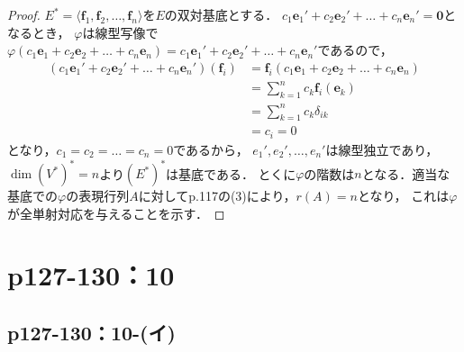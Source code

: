 \documentclass[a4paper,10pt,fleqn]{ltjsarticle}
\begin{document}
\begin{tleftbar}
\begin{proof}
        $ E^\ast = \langle \bm{f}_1 , \bm{f}_2 , \dots , \bm{f}_n \rangle$を$E$の双対基底とする．
        $ c_1 \bm{e}_1 ' + c_2 \bm{e}_2 ' + \dots + c_n \bm{e}_n ' = \bm{0}$となるとき，
        $\varphi$は線型写像で$\varphi (c_1 \bm{e}_1 + c_2 \bm{e}_2 + \dots + c_n \bm{e}_n) = c_1 \bm{e}_1 ' + c_2 \bm{e}_2 ' + \dots + c_n \bm{e}_n '$であるので，
        \begin{align*}
            (c_1 \bm{e}_1 ' + c_2 \bm{e}_2 ' + \dots + c_n \bm{e}_n ') (\bm{f}_i) & = \bm{f}_i (c_1 \bm{e}_1 + c_2 \bm{e}_2 + \dots + c_n \bm{e}_n) \\
                                                                                  & = \sum_{k=1}^{n} c_k \bm{f}_i (\bm{e}_k)                        \\
                                                                                  & = \sum_{k=1}^{n} c_k \delta_{ik}                                \\
                                                                                  & = c_i=0
        \end{align*}
        となり，$c_1 = c_2 = \dots = c_n = 0$であるから，
        $e_1 ' , e_2 ' , \dots , e_n '$は線型独立であり，
        $\dim (V^\ast)^\ast = n $より$(E^\ast)^\ast$は基底である．
        とくに$\varphi$の階数は$n$となる．適当な基底での$\varphi$の表現行列$A$に対してp.117の(3)により，$r(A)=n$となり，
        これは$\varphi$が全単射対応を与えることを示す．
    \end{proof}
\end{tleftbar}


\newpage


\section*{p127-130：10}


\subsection*{p127-130：10-(イ)}
\end{document}
